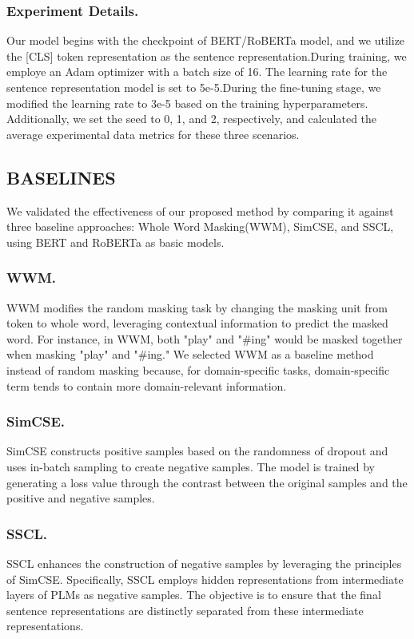 \subsubsection{Experiment Details.} Our model begins with the checkpoint of BERT/RoBERTa model, and we utilize the [CLS] token representation as the sentence representation.During training, we employe an Adam optimizer with a batch size of 16. The learning rate for the sentence representation model is set to 5e-5.During the fine-tuning stage, we modified the learning rate to 3e-5 based on the training hyperparameters. Additionally, we set the seed to 0, 1, and 2, respectively, and calculated the average experimental data metrics for these three scenarios.

\subsection{BASELINES}
We validated the effectiveness of our proposed method by comparing it against three baseline approaches: Whole Word Masking(WWM), SimCSE, and SSCL, using BERT and RoBERTa as basic models.

\subsubsection{WWM.} WWM modifies the random masking task by changing the masking unit from token to whole word, leveraging contextual information to predict the masked word. For instance, in WWM, both "play" and "\#ing" would be masked together when masking "play" and "\#ing." We selected WWM as a baseline method instead of random masking because, for domain-specific tasks, domain-specific term tends to contain more domain-relevant information.

\subsubsection{SimCSE.} SimCSE constructs positive samples based on the randomness of dropout and uses in-batch sampling to create negative samples. The model is trained by generating a loss value through the contrast between the original samples and the positive and negative samples.

\subsubsection{SSCL.} SSCL enhances the construction of negative samples by leveraging the principles of SimCSE. Specifically, SSCL employs hidden representations from intermediate layers of PLMs as negative samples. The objective is to ensure that the final sentence representations are distinctly separated from these intermediate representations.

